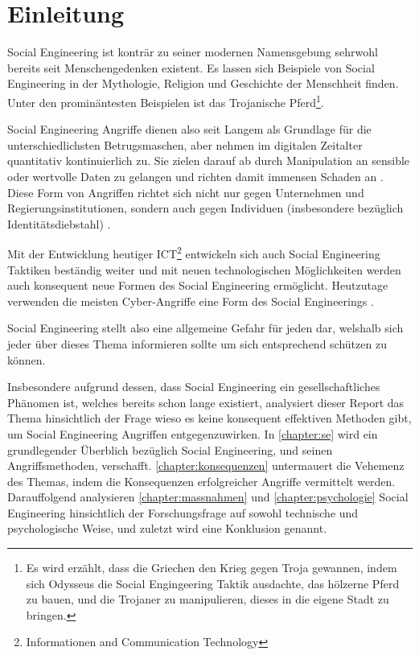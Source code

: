 \chapter{Einleitung}
\label{chapter:einleitung}

Social Engineering ist konträr zu seiner modernen Namensgebung sehrwohl bereits seit
Menschengedenken existent. Es lassen sich Beispiele von Social Engineering in der Mythologie,
Religion und Geschichte der Menschheit finden.
Unter den prominäntesten Beispielen ist das Trojanische Pferd\footnote{Es wird erzählt, dass
die Griechen den Krieg gegen Troja gewannen,
indem sich Odysseus die Social Engingeering Taktik ausdachte, das hölzerne Pferd zu bauen,
und die Trojaner zu manipulieren, dieses in die eigene Stadt zu bringen.}.

Social Engineering Angriffe dienen also seit Langem als Grundlage für die unterschiedlichsten Betrugsmaschen,
aber nehmen im digitalen Zeitalter quantitativ kontinuierlich zu.
Sie zielen darauf ab durch Manipulation an sensible oder wertvolle Daten zu gelangen
und richten damit immensen Schaden an .
Diese Form von Angriffen richtet sich nicht nur gegen Unternehmen und Regierungsinstitutionen,
sondern auch gegen Individuen (insbesondere bezüglich Identitätsdiebstahl) .

Mit der Entwicklung heutiger ICT\footnote{Informationen and Communication Technology} entwickeln sich auch
Social Engineering Taktiken beständig weiter und mit neuen technologischen Möglichkeiten werden auch
konsequent neue Formen des Social Engineering ermöglicht. Heutzutage verwenden die meisten
Cyber-Angriffe eine Form des Social Engineerings .

Social Engineering stellt also eine allgemeine Gefahr für jeden dar, welshalb sich jeder über dieses
Thema informieren sollte um sich entsprechend schützen zu können.

Insbesondere aufgrund dessen, dass Social Engineering ein gesellschaftliches Phänomen ist, welches bereits
schon lange existiert, analysiert dieser Report das Thema hinsichtlich der Frage wieso es keine konsequent effektiven
Methoden gibt, um Social Engineering Angriffen entgegenzuwirken.
In \autoref{chapter:se} wird ein grundlegender Überblich bezüglich Social Engineering, und seinen Angriffsmethoden, verschafft.
\autoref{chapter:konsequenzen} untermauert die Vehemenz des Themas, indem die Konsequenzen erfolgreicher Angriffe vermittelt werden.
Darauffolgend analysieren \autoref{chapter:massnahmen} und \autoref{chapter:psychologie} Social Engineering hinsichtlich der
Forschungsfrage auf sowohl technische und psychologische Weise, und zuletzt wird eine Konklusion genannt.








